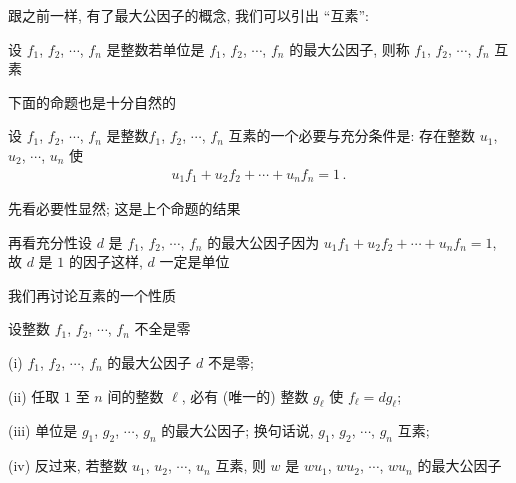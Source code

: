 跟之前一样, 有了最大公因子的概念, 我们可以引出 ``互素'':
\begin{definition}
    设 $f_1$, $f_2$, $\cdots$, $f_n$ 是整数\period 若单位是 $f_1$, $f_2$, $\cdots$, $f_n$ 的最大公因子, 则称 $f_1$, $f_2$, $\cdots$, $f_n$ 互素\period
\end{definition}

下面的命题也是十分自然的\period
\begin{proposition}
    设 $f_1$, $f_2$, $\cdots$, $f_n$ 是整数\period $f_1$, $f_2$, $\cdots$, $f_n$ 互素的一个必要与充分条件是: 存在整数 $u_1$, $u_2$, $\cdots$, $u_n$ 使
    \begin{align*}
        u_1 f_1 + u_2 f_2 + \cdots + u_n f_n = 1 \period
    \end{align*}
\end{proposition}

\begin{pf}
    先看必要性\period 显然; 这是上个命题的结果\period

    再看充分性\period 设 $d$ 是 $f_1$, $f_2$, $\cdots$, $f_n$ 的最大公因子\period 因为 $u_1 f_1 + u_2 f_2 + \cdots + u_n f_n = 1$, 故 $d$ 是 $1$ 的因子\period 这样, $d$ 一定是单位\period
\end{pf}

我们再讨论互素的一个性质\period

\begin{proposition}
    设整数 $f_1$, $f_2$, $\cdots$, $f_n$ 不全是零\period

    (i) $f_1$, $f_2$, $\cdots$, $f_n$ 的最大公因子 $d$ 不是零;

    (ii) 任取 $1$ 至 $n$ 间的整数 $\ell$, 必有 (唯一的) 整数 $g_\ell$ 使 $f_\ell = dg_\ell$;

    (iii) 单位是 $g_1$, $g_2$, $\cdots$, $g_n$ 的最大公因子; 换句话说, $g_1$, $g_2$, $\cdots$, $g_n$ 互素;

    (iv) 反过来, 若整数 $u_1$, $u_2$, $\cdots$, $u_n$ 互素, 则 $w$ 是 $wu_1$, $wu_2$, $\cdots$, $wu_n$ 的最大公因子\period
\end{proposition}

